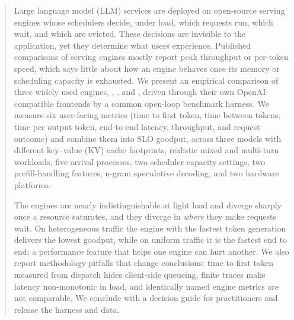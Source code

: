 \begin{abstract}
Large language model (LLM) services are deployed on open-source serving engines whose
schedulers decide, under load, which requests run, which wait, and which are evicted.
These decisions are invisible to the application, yet they determine what users experience.
Published comparisons of serving engines mostly report peak throughput or per-token speed,
which says little about how an engine behaves once its memory or scheduling capacity is
exhausted. We present an empirical comparison of three widely used engines, \vllm, \sglang,
and \trt, driven through their own OpenAI-compatible frontends by a common open-loop
benchmark harness. We measure six user-facing metrics (time to first token, time between
tokens, time per output token, end-to-end latency, throughput, and request outcome) and
combine them into SLO goodput, across three models with different key--value (KV) cache
footprints, realistic mixed and multi-turn workloads, five arrival processes, two scheduler
capacity settings, two prefill-handling features, n-gram speculative decoding, and two
hardware platforms.

The engines are nearly indistinguishable at light load and diverge sharply once a resource
saturates, and they diverge in \emph{where} they make requests wait. On heterogeneous
traffic the engine with the fastest token generation delivers the lowest goodput, while on
uniform traffic it is the fastest end to end; a performance feature that helps one engine
can hurt another. We also report methodology pitfalls that change conclusions: time to first
token measured from dispatch hides client-side queueing, finite traces make latency
non-monotonic in load, and identically named engine metrics are not comparable. We conclude
with a decision guide for practitioners and release the harness and data.
\end{abstract}
